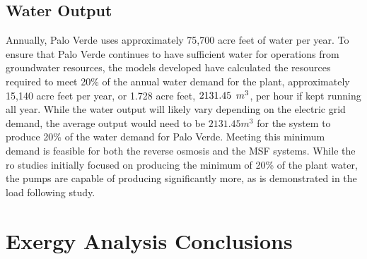 

\subsection{Water Output}
Annually, Palo Verde uses approximately 75,700 acre feet of water per year.  To ensure that Palo Verde continues to have sufficient water for operations from groundwater resources, the models developed have calculated the resources required to meet 20\% of the annual water demand for the plant, approximately 15,140 acre feet per year, or 1.728 acre feet, $2131.45 \hspace{.17 cm} m^3$, per hour if kept running all year. While the water output will likely vary depending on the electric grid demand, the average output would need to be $2131.45 m^3$ for the system to produce 20\% of the water demand for Palo Verde. Meeting this minimum demand is feasible for both the reverse osmosis and the MSF systems. While the \ac{ro} studies initially focused on producing the minimum of 20\% of the plant water, the pumps are capable of producing significantly more, as is demonstrated in the load following study.

\section{Exergy Analysis Conclusions}

